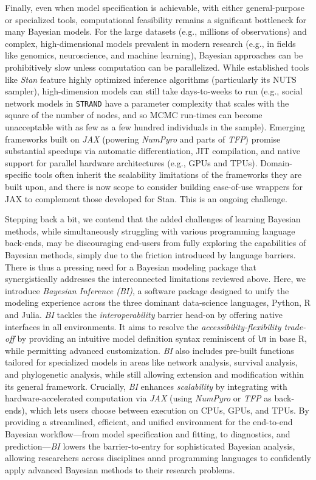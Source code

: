 \documentclass[blind,lineno,num-refs]{wiley-article}
\begin{document}
Finally, even when model specification is achievable, with either general-purpose or specialized tools, computational feasibility remains a significant bottleneck for many Bayesian models. For the large datasets (e.g., millions of observations) and complex, high-dimensional models prevalent in modern research (e.g., in fields like genomics, neuroscience, and machine learning), Bayesian approaches can be prohibitively slow unless computation can be parallelized. While established tools like \textit{Stan} feature highly optimized inference algorithms (particularly its NUTS sampler), high-dimension models can still take days-to-weeks to run (e.g., social network models in \texttt{STRAND} have a parameter complexity that scales with the square of the number of nodes, and so MCMC run-times can become unacceptable with as few as a few hundred individuals in the sample). Emerging frameworks built on \textit{JAX} \citep{jax2018github} (powering \textit{NumPyro} and parts of \textit{TFP}) promise substantial speedups via automatic differentiation, JIT compilation, and native support for parallel hardware architectures (e.g., GPUs and TPUs). Domain-specific tools often inherit the scalability limitations of the frameworks they are built upon, and there is now scope to consider building ease-of-use wrappers for JAX to complement those developed for Stan. This is an ongoing challenge. 

Stepping back a bit, we contend that the added challenges of learning Bayesian methods, while simultaneously struggling with various programming language back-ends, may be discouraging end-users from fully exploring the capabilities of Bayesian methods, simply due to the friction introduced by language barriers. There is thus a pressing need for a Bayesian modeling package that synergistically addresses the interconnected limitations reviewed above. Here, we introduce \textit{Bayesian Inference (BI)}, a software package designed to unify the modeling experience across the three dominant data-science languages, Python, R and Julia. \textit{BI} tackles the \textit{interoperability} barrier head-on by offering native interfaces in all environments. It aims to resolve the \textit{accessibility-flexibility trade-off} by providing an intuitive model definition syntax reminiscent of \texttt{lm} in base R, while permitting advanced customization. \textit{BI} also includes pre-built functions tailored for specialized models in areas like network analysis, survival analysis, and phylogenetic analysis, while still allowing extension and modification within its general framework. Crucially, \textit{BI} enhances \textit{scalability} by integrating with hardware-accelerated computation via \textit{JAX} (using \textit{NumPyro} or \textit{TFP} as back-ends), which lets users choose between execution on CPUs, GPUs, and TPUs. By providing a streamlined, efficient, and unified environment for the end-to-end Bayesian workflow---from model specification and fitting, to diagnostics, and prediction---\textit{BI} lowers the barrier-to-entry for sophisticated Bayesian analysis, allowing researchers across disciplines annd programming languages to confidently apply advanced Bayesian methods to their research problems.
\end{document}
